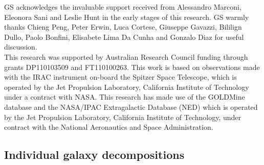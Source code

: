 \documentclass[preprint2]{emulateapj}
\begin{document}
\acknowledgments
GS acknowledges the invaluable support received from Alessandro Marconi, Eleonora Sani and Leslie Hunt 
in the early stages of this research.
GS warmly thanks Chieng Peng, Peter Erwin, Luca Cortese, Giuseppe Gavazzi, 
Bililign Dullo, Paolo Bonfini, Elisabete Lima Da Cunha 
and Gonzalo Diaz 
for useful discussion. \\
This research was supported by Australian Research Council funding through grants
DP110103509 and FT110100263.
This work is based on observations made with the IRAC instrument \citep{fazio2004IRAC} 
on-board the Spitzer Space Telescope, 
which is operated by the Jet Propulsion Laboratory, 
California Institute of Technology under a contract with NASA.
This research has made use of the GOLDMine database \citep{goldmine} and the NASA/IPAC Extragalactic Database (NED) 
which is operated by the Jet Propulsion Laboratory, California Institute of Technology, 
under contract with the National Aeronautics and Space Administration. 


\clearpage

  \onecolumngrid
  \subsection{Individual galaxy decompositions}
  \label{sec:indgal}
\end{document}

